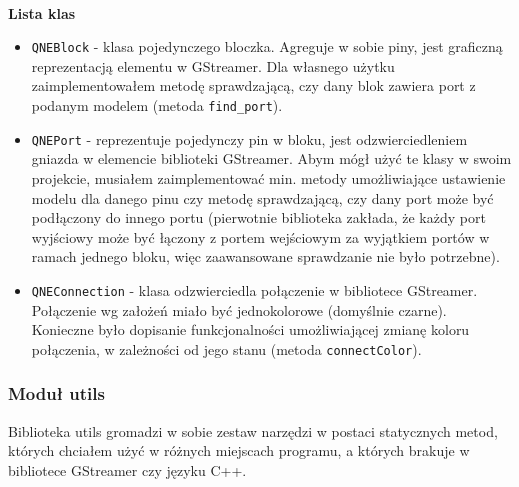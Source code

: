 \documentclass[12pt]{article}
\begin{document}
\paragraph{}
\textbf{Lista klas}
\vspace{-2mm}
\begin{itemize}
 \setlength{\itemsep}{0em}
\item \texttt{QNEBlock} - klasa pojedynczego bloczka. Agreguje w sobie piny, jest graficzną reprezentacją elementu w GStreamer. Dla własnego użytku zaimplementowałem metodę sprawdzającą, czy dany blok zawiera port z podanym modelem (metoda \texttt{find\_port}).
\item \texttt{QNEPort} - reprezentuje pojedynczy pin w bloku, jest odzwierciedleniem gniazda w elemencie biblioteki GStreamer. Abym mógł użyć te klasy w swoim projekcie, musiałem zaimplementować min. metody umożliwiające ustawienie modelu dla danego pinu czy metodę sprawdzającą, czy dany port może być podłączony do innego portu (pierwotnie biblioteka zakłada, że każdy port wyjściowy może być łączony z portem wejściowym za wyjątkiem portów w ramach jednego bloku, więc zaawansowane sprawdzanie nie było potrzebne).
\item \texttt{QNEConnection} - klasa odzwierciedla połączenie w bibliotece GStreamer. Połączenie wg założeń miało być jednokolorowe (domyślnie czarne). Konieczne było dopisanie funkcjonalności umożliwiającej zmianę koloru połączenia, w zależności od jego stanu (metoda \texttt{connectColor}).
\end{itemize}
\subsubsection{Moduł utils}
Biblioteka utils gromadzi w sobie zestaw narzędzi w postaci statycznych metod, których chciałem użyć w różnych miejscach programu, a których brakuje w bibliotece GStreamer czy języku C++.
\end{document}
